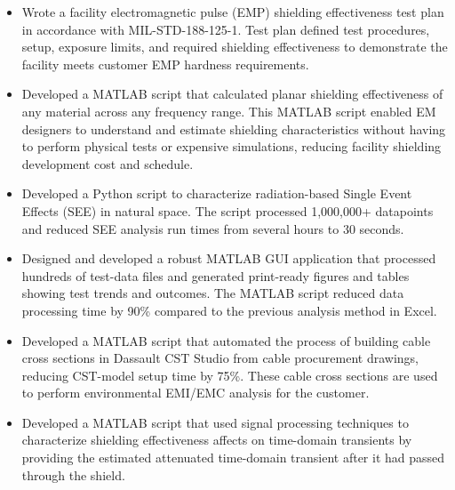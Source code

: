 \documentclass[letterpaper,12pt]{article}
\newcommand{\simpleParagraph}[1]{
    \vspace{-1pt}
    \begin{adjustwidth}{7pt}{0pt}
        #1
    \end{adjustwidth}
}
\newcommand{\matlab}[0]{
    MATLAB
}
\begin{document}
    \simpleParagraph{
        \begin{itemize}
            \item Wrote a facility electromagnetic pulse (EMP) shielding effectiveness test plan in
                accordance with MIL-STD-188-125-1. Test plan defined test procedures, setup, exposure
                limits, and required shielding effectiveness to demonstrate the facility meets customer 
                EMP hardness requirements.

            \item Developed a \matlab script that calculated planar shielding effectiveness of any
                material across any frequency range. This \matlab script enabled EM designers to understand
                and estimate shielding characteristics without having to perform physical tests or expensive 
                simulations, reducing facility shielding development cost and schedule.

            \item Developed a Python script to characterize radiation-based Single Event Effects (SEE) in
                natural space. The script processed 1,000,000+ datapoints and reduced SEE analysis
                run times from several hours to 30 seconds.

            \item Designed and developed a robust \matlab GUI application that processed hundreds
                of test-data files and generated print-ready figures and tables showing test trends and outcomes.
                The \matlab script reduced data processing time by 90\% compared to the previous analysis 
                method in Excel.

            \item Developed a MATLAB script that automated the process of building cable cross sections
                in Dassault CST Studio from cable procurement drawings, reducing CST-model setup time by 75\%.
                These cable cross sections are used to perform environmental EMI/EMC analysis for the 
                customer.

            \item Developed a MATLAB script that used signal processing techniques to characterize
                shielding effectiveness affects on time-domain transients by providing the estimated 
                attenuated time-domain transient after it had passed through the shield.


        \end{itemize}
    }
\end{document}

